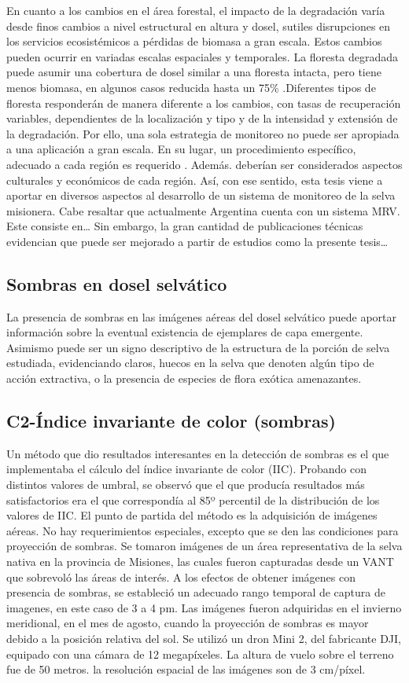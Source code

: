 En cuanto a los cambios en el área forestal, el impacto de la degradación varía desde finos cambios a nivel estructural en altura y dosel, sutiles disrupciones en los servicios ecosistémicos a pérdidas de biomasa a gran escala. Estos cambios pueden ocurrir en variadas escalas espaciales y temporales. La floresta degradada puede asumir una cobertura de dosel similar a una floresta intacta, pero tiene menos biomasa, en algunos casos reducida hasta un 75\% \cite{change_report_2006}.Diferentes tipos de floresta responderán de manera diferente a los cambios, con tasas de recuperación variables, dependientes de la localización y tipo y de la intensidad y extensión de la degradación. Por ello, una sola estrategia de monitoreo no puede ser apropiada a una aplicación a gran escala. En su lugar, un procedimiento específico, adecuado a cada región es requerido \cite{mitchell_current_2017}. Además. deberían ser considerados aspectos culturales y económicos de cada región. Así, con ese sentido, esta tesis viene a aportar en diversos aspectos al desarrollo de un sistema de monitoreo de la selva misionera.
Cabe resaltar que actualmente Argentina cuenta con un sistema MRV. Este consiste en…
Sin embargo, la gran cantidad de publicaciones técnicas evidencian que puede ser mejorado a partir de estudios como la presente tesis…

\subsection{Sombras en dosel selvático}
La presencia de sombras en las imágenes aéreas del dosel selvático puede aportar información sobre la eventual existencia de ejemplares de capa emergente. Asimismo puede ser un signo descriptivo de la estructura de la porción de selva estudiada, evidenciando claros, huecos en la selva que denoten algún tipo de acción extractiva, o la presencia de especies de flora exótica amenazantes.
\color{cyan}
\subsection{C2-Índice invariante de color (sombras)}
Un método que dio resultados interesantes en la detección de sombras es el que implementaba el cálculo del índice invariante de color (IIC). Probando con distintos valores de umbral, se observó que el que producía resultados más satisfactorios era el que correspondía al 85º percentil de la distribución de los valores de IIC.
El punto de partida del método es la adquisición de imágenes aéreas. No hay requerimientos especiales, excepto que se den las condiciones para proyección de sombras. Se tomaron imágenes de un área representativa de la selva nativa en la provincia de Misiones, las cuales fueron capturadas desde un VANT que sobrevoló las áreas de interés. A los efectos de obtener imágenes con presencia de sombras, se estableció un adecuado rango temporal de captura de imagenes, en este caso de 3 a 4 pm. Las imágenes fueron adquiridas en el invierno meridional, en el mes de agosto, cuando la proyección de sombras es mayor debido a la posición relativa del sol. Se utilizó un dron Mini 2, del fabricante DJI, equipado con una cámara de 12 megapíxeles. La altura de vuelo sobre el terreno fue de 50 metros. la resolución espacial de las imágenes son de 3 cm/píxel.